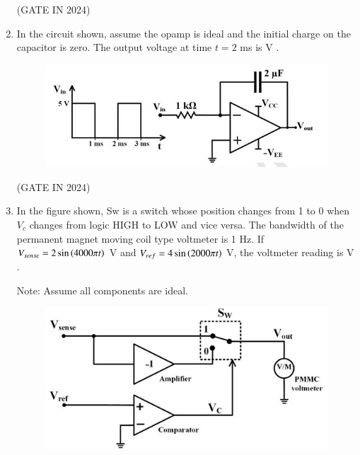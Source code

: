 \documentclass[journal,12pt,onecolumn]{IEEEtran}
\theoremstyle{remark}
\begin{document}
\begin{enumerate}
    \hfill{(GATE IN 2024)}
    
    \item In the circuit shown, assume the opamp is ideal and the initial charge on the capacitor is zero. The output voltage at time $t=2$ ms is \underline{\hspace{2cm}} V .
    \begin{figure}[H]
        \centering
        \includegraphics[width=0.9\columnwidth]{figs/p32.jpg}
        \caption*{}
        \label{fig:p32}
    \end{figure}
    
    \hfill{(GATE IN 2024)}
    
    \item In the figure shown, Sw is a switch whose position changes from 1 to 0 when $V_c$ changes from logic HIGH to LOW and vice versa. The bandwidth of the permanent magnet moving coil  type voltmeter is 1 Hz. If $V_{sense} = 2 \sin\left(4000\pi t\right)$ V and $V_{ref} = 4 \sin\left(2000\pi t\right)$ V, the voltmeter reading is \underline{\hspace{2cm}} V .
    
    Note: Assume all components are ideal.
    \begin{figure}[H]
        \centering
        \includegraphics[width=0.8\columnwidth]{figs/p33.jpg}
        \caption*{}
        \label{fig:p33}
    \end{figure}
    

\end{enumerate}
\end{document}
